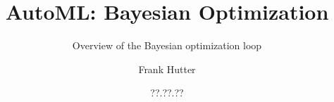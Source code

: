 %  




\usepackage[export]{adjustbox}
\usepackage{pgfpages}

\title[AutoML: Bayesian Optimization]{AutoML: Bayesian Optimization}
\subtitle{Overview of the Bayesian optimization loop}
\author[Frank Hutter]{Frank Hutter}
\date{??.??.??}




	
	\maketitle
	
    
    
    
    
    
    
    
    
    
    


